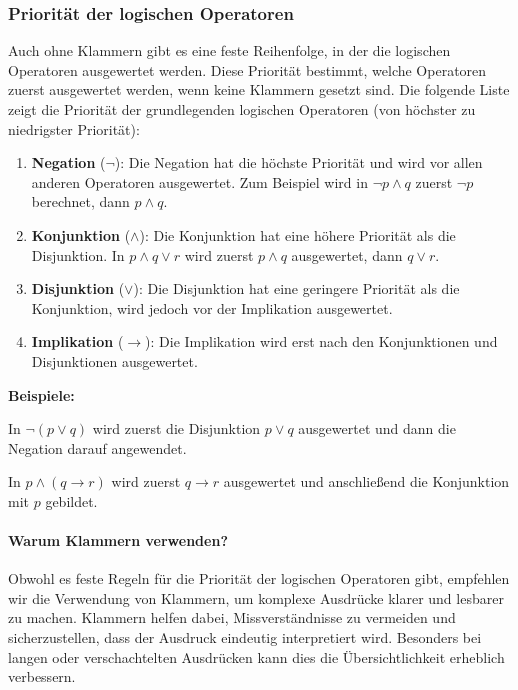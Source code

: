 \documentclass[main.tex]{subfiles}
\begin{document}
\subsubsection{Priorität der logischen Operatoren}

Auch ohne Klammern gibt es eine feste Reihenfolge, in der die logischen Operatoren ausgewertet werden. Diese Priorität bestimmt, welche Operatoren zuerst ausgewertet werden, wenn keine Klammern gesetzt sind. Die folgende Liste zeigt die Priorität der grundlegenden logischen Operatoren (von höchster zu niedrigster Priorität):

\begin{enumerate}
    \item \textbf{Negation} (\(\neg\)): Die Negation hat die höchste Priorität und wird vor allen anderen Operatoren ausgewertet. Zum Beispiel wird in \(\neg p \land q\) zuerst \(\neg p\) berechnet, dann \(p \land q\).
    \item \textbf{Konjunktion} (\(\land\)): Die Konjunktion hat eine höhere Priorität als die Disjunktion. In \(p \land q \lor r\) wird zuerst \(p \land q\) ausgewertet, dann \(q \lor r\).
    \item \textbf{Disjunktion} (\(\lor\)): Die Disjunktion hat eine geringere Priorität als die Konjunktion, wird jedoch vor der Implikation ausgewertet.
    \item \textbf{Implikation} (\(\rightarrow\)): Die Implikation wird erst nach den Konjunktionen und Disjunktionen ausgewertet.
\end{enumerate}

\textbf{Beispiele:}
\begin{example}
    \item In \(\neg (p \lor q)\) wird zuerst die Disjunktion \(p \lor q\) ausgewertet und dann die Negation darauf angewendet.
    \item In \(p \land (q \rightarrow r)\) wird zuerst \(q \rightarrow r\) ausgewertet und anschließend die Konjunktion mit \(p\) gebildet.
\end{example}

\paragraph{Warum Klammern verwenden?}

Obwohl es feste Regeln für die Priorität der logischen Operatoren gibt, empfehlen wir die Verwendung von Klammern, um komplexe Ausdrücke klarer und lesbarer zu machen. Klammern helfen dabei, Missverständnisse zu vermeiden und sicherzustellen, dass der Ausdruck eindeutig interpretiert wird. Besonders bei langen oder verschachtelten Ausdrücken kann dies die Übersichtlichkeit erheblich verbessern.
\end{document}
